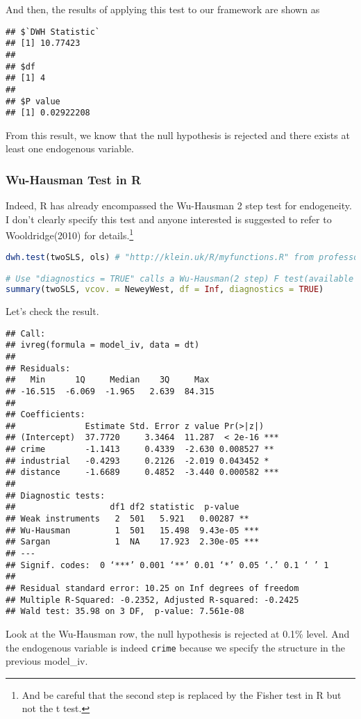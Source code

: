\documentclass{article}
\theoremstyle{definition}
\begin{document}
And then, the results of applying this test to our framework are shown as
\begin{verbatim}
## $`DWH Statistic`
## [1] 10.77423
## 
## $df
## [1] 4
## 
## $P value
## [1] 0.02922208
\end{verbatim}

From this result, we know that the null hypothesis is rejected and there exists at least one endogenous variable.

\subsubsection{Wu-Hausman Test in R}
Indeed, R has already encompassed the Wu-Hausman 2 step test for endogeneity. I don't clearly specify this test and anyone interested is suggested to refer to Wooldridge(2010)\cite{JMW10} for details.\footnote{And be careful that the second step is replaced by the Fisher test in R but not the t test.}

\begin{lstlisting}[language = R]
dwh.test(twoSLS, ols) # "http://klein.uk/R/myfunctions.R" from professor Thilo Klein.

# Use "diagnostics = TRUE" calls a Wu-Hausman(2 step) F test(available in Wooldridge(2003)).
summary(twoSLS, vcov. = NeweyWest, df = Inf, diagnostics = TRUE)
\end{lstlisting}

Let's check the result.
\begin{verbatim}
## Call:
## ivreg(formula = model_iv, data = dt)
##
## Residuals:
##   Min      1Q     Median    3Q     Max 
## -16.515  -6.069  -1.965   2.639  84.315 
##
## Coefficients:
##              Estimate Std. Error z value Pr(>|z|)    
## (Intercept)  37.7720     3.3464  11.287  < 2e-16 ***
## crime        -1.1413     0.4339  -2.630 0.008527 ** 
## industrial   -0.4293     0.2126  -2.019 0.043452 *  
## distance     -1.6689     0.4852  -3.440 0.000582 ***
##
## Diagnostic tests:
##                   df1 df2 statistic  p-value    
## Weak instruments   2  501   5.921   0.00287 ** 
## Wu-Hausman         1  501   15.498  9.43e-05 ***
## Sargan             1  NA    17.923  2.30e-05 ***
## ---
## Signif. codes:  0 ‘***’ 0.001 ‘**’ 0.01 ‘*’ 0.05 ‘.’ 0.1 ‘ ’ 1
##
## Residual standard error: 10.25 on Inf degrees of freedom
## Multiple R-Squared: -0.2352,	Adjusted R-squared: -0.2425 
## Wald test: 35.98 on 3 DF,  p-value: 7.561e-08 
\end{verbatim}

Look at the Wu-Hausman row, the null hypothesis is rejected at 0.1\% level. And the endogenous variable is indeed \texttt{crime} because we specify the structure in the previous {\color{blue}model\_iv}.
\end{document}
